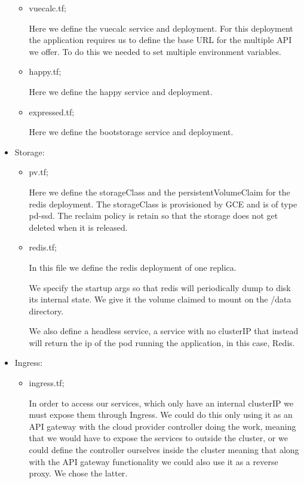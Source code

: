\documentclass[12pt,a4paper,oneside]{report}
\begin{document}
\begin{itemize}
\begin{itemize}
			\item vuecalc.tf;
			
			Here we define the vuecalc service and deployment.
		    For this deployment the application requires us to define the base \ac{URL} for the multiple \ac{API} we offer. To do this we needed to set multiple environment variables.
			
			\item happy.tf;
			
			Here we define the happy service and deployment.
			
			\item expressed.tf;
			
			Here we define the bootstorage service and deployment.
		\end{itemize}
	\item Storage: 
		\begin{itemize}
			\item pv.tf;
			
			    Here we define the storageClass and the persistentVolumeClaim for the redis deployment.
			    The storageClass is provisioned by \ac{GCE} and is of type pd-ssd. The reclaim policy is retain so that the storage does not get deleted when it is released.
			    
			\item redis.tf;
			
			    In this file we define the redis deployment of one replica. 
			    
			    We specify the startup args so that redis will periodically dump to disk its internal state.
			    We give it the volume claimed to mount on the /data directory.
			    
			    We also define a headless service, a service with no clusterIP that instead will return the ip of the pod running the application, in this case, Redis. 
		\end{itemize}
	\item Ingress:
		\begin{itemize}
			\item ingress.tf;
			
			In order to access our services, which only have an internal clusterIP we must expose them through Ingress. We could do this only using it as an \ac{API} gateway with the cloud provider controller doing the work, meaning that we would have to expose the services to outside the cluster, or we could define the controller ourselves inside the cluster meaning that along with the \ac{API} gateway functionality we could also use it as a reverse proxy. We chose the latter. 
			

\end{itemize}
\end{itemize}
\end{document}
